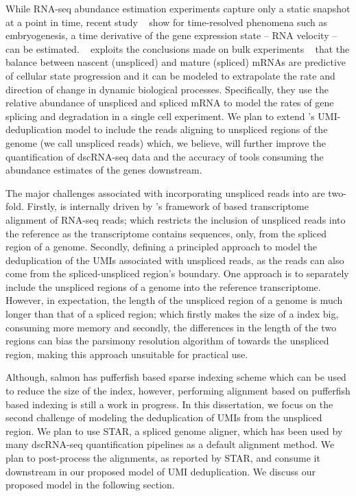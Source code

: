 While RNA-seq abundance estimation experiments capture only a static snapshot at a point in time, 
recent study ~\citep{la2018rna} show for time-resolved phenomena such as embryogenesis, a time derivative of 
the gene expression state -- RNA velocity -- can be estimated. ~\cite{la2018rna} exploits the 
conclusions made on bulk experiments ~\citep{zeisel2011coupled} that the balance between nascent (unspliced) and mature 
(spliced) mRNAs are predictive of cellular state progression and it can be modeled to extrapolate the 
rate and direction of change in dynamic biological processes. Specifically, they use the relative 
abundance of unspliced and spliced mRNA to model the rates of gene splicing and degradation in a
single cell experiment. We plan to extend \alevin's UMI-deduplication model to include the reads 
aligning to unspliced regions of the genome (we call unspliced reads) which, we believe, 
will further improve the quantification of dscRNA-seq data and the accuracy of tools consuming
the abundance estimates of the genes downstream.

The major challenges associated with incorporating unspliced reads into \alevin are two-fold.
Firstly, \alevin is internally driven by \salmon's framework of \rapmap based transcriptome 
alignment of RNA-seq reads; which restricts the inclusion of unspliced reads into the reference 
as the transcriptome contains sequences, only, from the spliced region of a genome. 
Secondly, defining a principled approach to model the deduplication of the UMIs associated 
with unspliced reads, as the reads can also come from the spliced-unspliced region's boundary. 
One \naive approach is to separately include the unspliced regions of a genome into the reference 
transcriptome. However, in expectation, the length of the unspliced region of a genome is much 
longer than that of a spliced region; which firstly makes the size of a \salmon index big, 
consuming more memory and secondly, the differences in the length of the two regions can bias 
the parsimony resolution algorithm of \alevin towards the unspliced region, making this 
\naive approach unsuitable for practical use.

Although, salmon has pufferfish based sparse indexing scheme which can be used to reduce the 
size of the index, however, performing alignment based on pufferfish based indexing is 
still a work in progress. In this dissertation, we focus on the second challenge of modeling 
the deduplication of UMIs from the unspliced region. We plan to use STAR, a spliced genome aligner, 
which has been used by many dscRNA-seq quantification pipelines as a default alignment method.
We plan to post-process the alignments, as reported by STAR, and consume it downstream in
our proposed model of UMI deduplication. We discuss our proposed model in the following section.

